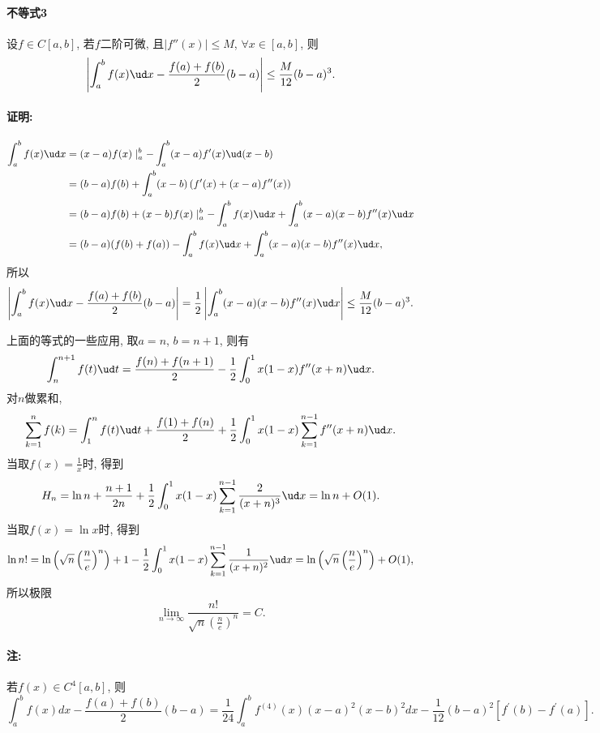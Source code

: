 \paragraph{不等式3}

设$f\in C[a,b]$, 若$f$二阶可微, 且$\left|f''(x)\right|\le M$, $\forall x\in[a,b]$,
则
\[
\left|\int_{a}^{b}f(x)\ud x-\frac{f(a)+f(b)}{2}(b-a)\right|\le\frac{M}{12}(b-a)^{3}.
\]


\paragraph{证明:}

\begin{align*}
	\int_{a}^{b}f(x)\ud x & =(x-a)f(x)\mid_{a}^{b}-\int_{a}^{b}(x-a)f'(x)\ud(x-b)\\
	& =(b-a)f(b)+\int_{a}^{b}(x-b)\left(f'(x)+(x-a)f''(x)\right)\\
	& =(b-a)f(b)+(x-b)f(x)\mid_{a}^{b}-\int_{a}^{b}f(x)\ud x+\int_{a}^{b}(x-a)(x-b)f''(x)\ud x\\
	& =(b-a)(f(b)+f(a))-\int_{a}^{b}f(x)\ud x+\int_{a}^{b}(x-a)(x-b)f''(x)\ud x,
\end{align*}
所以
\[
\left|\int_{a}^{b}f(x)\ud x-\frac{f(a)+f(b)}{2}(b-a)\right|=\frac{1}{2}\left|\int_{a}^{b}(x-a)(x-b)f''(x)\ud x\right|\le\frac{M}{12}(b-a)^{3}.
\]

上面的等式的一些应用, 取$a=n$, $b=n+1$, 则有
\[
\int_{n}^{n+1}f(t)\ud t=\frac{f(n)+f(n+1)}{2}-\frac{1}{2}\int_{0}^{1}x(1-x)f''(x+n)\ud x.
\]
对$n$做累和, 
\[
\sum_{k=1}^{n}f(k)=\int_{1}^{n}f(t)\ud t+\frac{f(1)+f(n)}{2}+\frac{1}{2}\int_{0}^{1}x(1-x)\sum_{k=1}^{n-1}f''(x+n)\ud x.
\]
当取$f(x)=\frac{1}{x}$时, 得到
\[
H_{n}=\ln n+\frac{n+1}{2n}+\frac{1}{2}\int_{0}^{1}x(1-x)\sum_{k=1}^{n-1}\frac{2}{(x+n)^{3}}\ud x=\ln n+O(1).
\]
当取$f(x)=\ln x$时, 得到
\[
\ln n!=\ln\left(\sqrt{n}\left(\frac{n}{e}\right)^{n}\right)+1-\frac{1}{2}\int_{0}^{1}x(1-x)\sum_{k=1}^{n-1}\frac{1}{(x+n)^{2}}\ud x=\ln\left(\sqrt{n}\left(\frac{n}{e}\right)^{n}\right)+O(1),
\]
所以极限
\[
\lim_{n\to\infty}\frac{n!}{\sqrt{n}\left(\frac{n}{e}\right)^{n}}=C.
\]


\paragraph{注:}

若$f(x)\in C^{4}[a,b]$, 则
\[
\int_{a}^{b}f(x)dx-\frac{f(a)+f(b)}{2}(b-a)=\frac{1}{24}\int_{a}^{b}f^{(4)}(x)(x-a)^{2}(x-b)^{2}dx-\frac{1}{12}(b-a)^{2}\left[f^{\prime}(b)-f^{\prime}(a)\right].
\]


